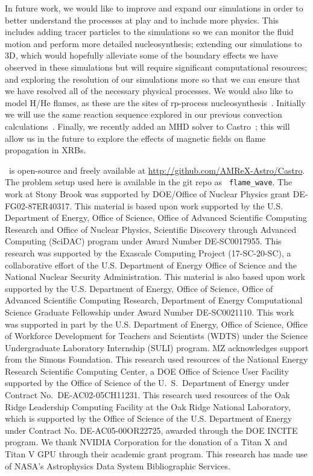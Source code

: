 \documentclass[preprint,times,tighten]{aastex63}
\newcommand{\castro}{{\sf Castro}}
\begin{document}
In future work, we would like to improve and expand our
simulations in order to better understand the processes at play and to
include more physics. This includes adding tracer particles to the
simulations so we can monitor the fluid motion and perform more
detailed nucleosynthesis; extending our simulations to 3D, which would
hopefully alleviate some of the boundary effects we have observed in
these simulations but will require significant computational resources;
and exploring the resolution of our simulations more so that we can
ensure that we have resolved all of the necessary physical processes. We
would also like to model H/He flames, as these are the sites of
rp-process nucleosynthesis~\citep{rpprocess}.  Initially we will use the same reaction
sequence explored in our previous convection
calculations~\citep{xrb2}.  Finally, we
recently added an MHD solver to \castro~\citep{sazo2020thesis}; this
will allow us in the future to explore the effects of magnetic fields on flame
propagation in XRBs.




\acknowledgments \castro\ is open-source and freely available at
\url{http://github.com/AMReX-Astro/Castro}.  The problem setup used
here is available in the git repo as {\tt
  flame\_wave}.  The work at Stony Brook was supported by DOE/Office
of Nuclear Physics grant DE-FG02-87ER40317.  This material is based upon work supported by the
U.S. Department of Energy, Office of Science, Office of Advanced
Scientific Computing Research and Office of Nuclear Physics, Scientific
Discovery through Advanced Computing (SciDAC) program under Award
Number DE-SC0017955.  This research was supported by the Exascale Computing Project (17-SC-20-SC), a collaborative effort of the U.S. Department of Energy Office of Science and the National Nuclear Security Administration.
This material is also based upon work supported by the U.S. Department
of Energy, Office of Science, Office of Advanced Scientific Computing Research, Department of
Energy Computational Science Graduate Fellowship under Award Number DE-SC0021110. This work was supported in part by the U.S. Department of Energy, Office of Science, Office of Workforce Development for Teachers and Scientists (WDTS) under the Science Undergraduate Laboratory Internship (SULI) program. MZ acknowledges support from the Simons Foundation. 
This research used resources of the National Energy
Research Scientific Computing Center, a DOE Office of Science User
Facility supported by the Office of Science of the U.~S.\ Department
of Energy under Contract No.\ DE-AC02-05CH11231.  This research used
resources of the Oak Ridge Leadership Computing Facility at the Oak
Ridge National Laboratory, which is supported by the Office of Science
of the U.S. Department of Energy under Contract No. DE-AC05-00OR22725,
awarded through the DOE INCITE program.  We thank NVIDIA Corporation
for the donation of a Titan X and Titan V GPU through their academic
grant program.  This research has made use of NASA's Astrophysics Data
System Bibliographic Services.
\end{document}
